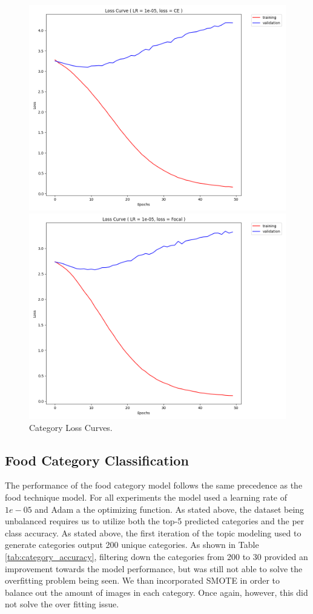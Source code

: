 \documentclass[10pt,twocolumn,letterpaper]{article}
\begin{document}
\begin{figure}
\begin{subfigure}
    \begin{left}
    \includegraphics[width=0.45\linewidth]{lr_1e-05_e50_CE_loss_history}
    \end{left}
\end{subfigure}%
\begin{subfigure}
    \begin{right}
    \includegraphics[width=0.45\linewidth]{lr_1e-05_e50_Focal_loss_history}
    \end{right}
\end{subfigure}%
  \caption{Category Loss Curves.}
\label{fig:category_loss_curve}
\end{figure}
\subsection{Food Category Classification}
The performance of the food category model follows the same precedence as the food technique model. For all experiments the model used a learning rate of $1e-05$ and Adam a the optimizing function. As stated above, the dataset being unbalanced requires us to utilize both the top-5 predicted categories and the per class accuracy. As stated above, the first iteration of the topic modeling used to generate categories output 200 unique categories. As shown in Table \ref{tab:category_accuracy}, filtering down the categories from 200 to 30 provided an improvement towards the model performance, but was still not able to solve the overfitting problem being seen. We than incorporated SMOTE in order to balance out the amount of images in each category. Once again, however, this did not solve the over fitting issue. 
\end{document}
